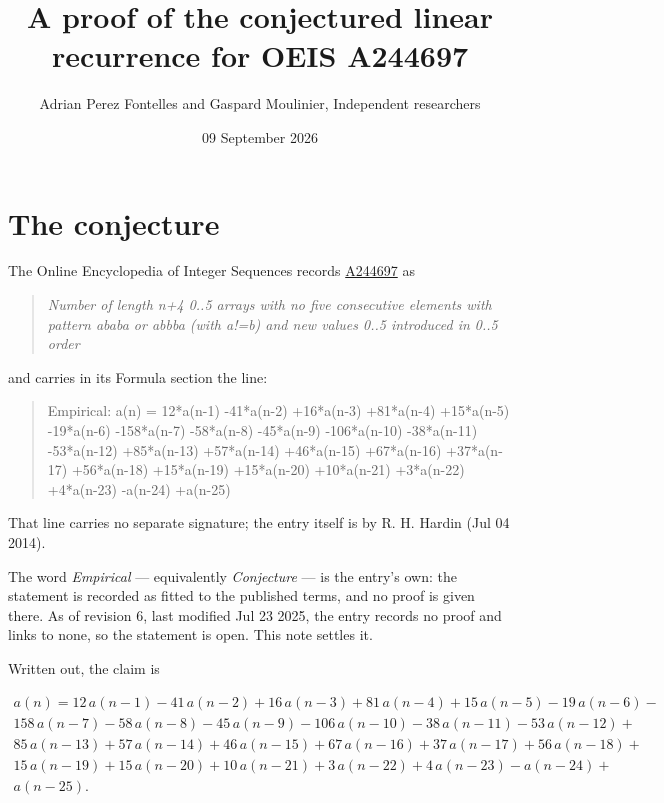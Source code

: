 \documentclass[11pt]{article}
\title{A proof of the conjectured linear recurrence for OEIS A244697}
\author{Adrian Perez Fontelles and Gaspard Moulinier, Independent researchers}
\date{09 September 2026}
\theoremstyle{definition}
\begin{document}
\maketitle
\section{The conjecture}

The Online Encyclopedia of Integer Sequences records \href{https://oeis.org/A244697}{A244697} as

\begin{quote}\itshape Number of length n+4 0..5 arrays with no five consecutive elements with pattern ababa or abbba (with a!=b) and new values 0..5 introduced in 0..5 order\end{quote}

and carries in its Formula section the line:

\begin{quote}\ttfamily Empirical: a(n) = 12*a(n-1) -41*a(n-2) +16*a(n-3) +81*a(n-4) +15*a(n-5) -19*a(n-6) -158*a(n-7) -58*a(n-8) -45*a(n-9) -106*a(n-10) -38*a(n-11) -53*a(n-12) +85*a(n-13) +57*a(n-14) +46*a(n-15) +67*a(n-16) +37*a(n-17) +56*a(n-18) +15*a(n-19) +15*a(n-20) +10*a(n-21) +3*a(n-22) +4*a(n-23) -a(n-24) +a(n-25)\end{quote}

That line carries no separate signature; the entry itself is by R. H. Hardin (Jul 04 2014).

The word {\itshape Empirical} --- equivalently {\itshape Conjecture} --- is the entry's own: the statement is recorded as fitted to the published terms, and no proof is given there. As of revision 6, last modified Jul 23 2025, the entry records no proof and links to none, so the statement is open. This note settles it.

Written out, the claim is

\begin{multline*} a(n) = 12\,a(n-1) - 41\,a(n-2) + 16\,a(n-3) + 81\,a(n-4) + 15\,a(n-5) - 19\,a(n-6) - \\ 158\,a(n-7) - 58\,a(n-8) - 45\,a(n-9) - 106\,a(n-10) - 38\,a(n-11) - 53\,a(n-12) + \\ 85\,a(n-13) + 57\,a(n-14) + 46\,a(n-15) + 67\,a(n-16) + 37\,a(n-17) + 56\,a(n-18) + \\ 15\,a(n-19) + 15\,a(n-20) + 10\,a(n-21) + 3\,a(n-22) + 4\,a(n-23) - a(n-24) + \\ a(n-25). \end{multline*}
\end{document}

